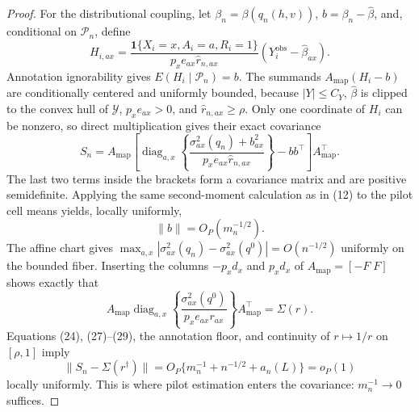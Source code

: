 \documentclass{article}
\begin{document}
\begin{proof}
For the distributional coupling, let \(\beta_n=\beta(q_n(h,v))\), \(b=\beta_n-\widehat\beta\), and, conditional on \(\mathscr P_n\), define
\[
H_{i,ax}=\frac{\mathbf1\{X_i=x,A_i=a,R_i=1\}}
{p_xe_{ax}\widehat r_{n,ax}}
(Y_i^{\mathrm{obs}}-\widehat\beta_{ax}).
\tag{26}
\]
Annotation ignorability gives \(E(H_i\mid\mathscr P_n)=b\). The summands \(A_{\mathrm{map}}(H_i-b)\) are conditionally centered and uniformly bounded, because \(|Y|\le C_Y\), \(\widehat\beta\) is clipped to the convex hull of \(\mathcal Y\), \(p_xe_{ax}>0\), and \(\widehat r_{n,ax}\ge\rho\). Only one coordinate of \(H_i\) can be nonzero, so direct multiplication gives their exact covariance
\[
S_n=A_{\mathrm{map}}\left[
\operatorname{diag}_{a,x}\left\{
\frac{\sigma^2_{ax}(q_n)+b_{ax}^2}
{p_xe_{ax}\widehat r_{n,ax}}
\right\}-bb^\top\right]A_{\mathrm{map}}^\top.
\tag{27}
\]
The last two terms inside the brackets form a covariance matrix and are positive semidefinite. Applying the same second-moment calculation as in (12) to the pilot cell means yields, locally uniformly,
\[
\lVert b\rVert=O_P(m_n^{-1/2}).
\tag{28}
\]
The affine chart gives \(\max_{a,x}|\sigma^2_{ax}(q_n)-\sigma^2_{ax}(q^0)|=O(n^{-1/2})\) uniformly on the bounded fiber. Inserting the columns \(-p_xd_x\) and \(p_xd_x\) of \(A_{\mathrm{map}}=[-F\;F]\) shows exactly that
\[
A_{\mathrm{map}}\operatorname{diag}_{a,x}\left\{
\frac{\sigma^2_{ax}(q^0)}{p_xe_{ax}r_{ax}}
\right\}A_{\mathrm{map}}^\top=\Sigma(r).
\tag{29}
\]
Equations (24), (27)--(29), the annotation floor, and continuity of \(r\mapsto1/r\) on \([\rho,1]\) imply
\[
\lVert S_n-\Sigma(r^\dagger)\rVert
=O_P\{m_n^{-1}+n^{-1/2}+a_n(L)\}=o_P(1)
\tag{30}
\]
locally uniformly. This is where pilot estimation enters the covariance: \(m_n^{-1}\to0\) suffices.


\end{proof}
\end{document}
